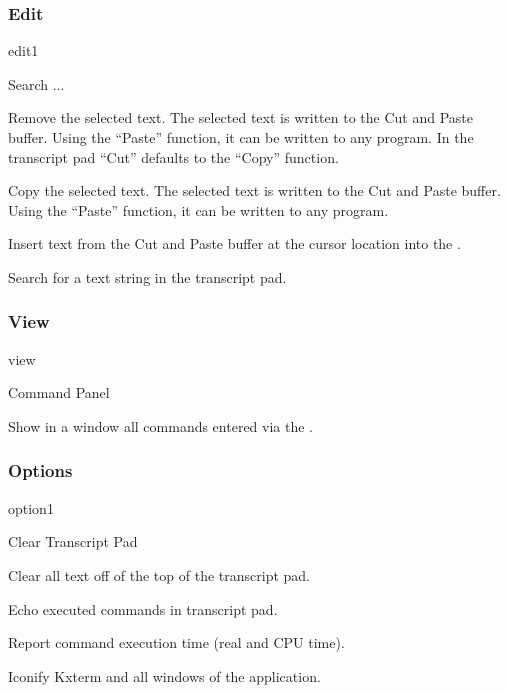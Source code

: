 \subsubsection{Edit}
\begin{PAWf}{edit1}
\begin{DLsf}{Search ...}
\item[Cut]
         Remove the selected text. The selected text is written to the
         Cut and Paste buffer. Using the ``Paste'' function, it can be
         written to any \Xxi program. In the transcript pad ``Cut''
         defaults to the ``Copy'' function.
\item[Copy]
         Copy the selected text. The selected text is written to the
         Cut and Paste buffer. Using the ``Paste'' function, it can be
         written to any \Xxi program.
\item[Paste]
         Insert text from the Cut and Paste buffer at the cursor location
         into the \IP.
\item[Search...]
         Search for a text string in the transcript pad.
\end{DLsf}
\end{PAWf}

\subsubsection{View}

\begin{PAWf}{view}
\begin{DLsf}{Command Panel}
\item[Show Input]
         Show in a window all commands entered via the \IP.
\item[Command Panel]
\item[Browser]
\item[Style Panel]
\end{DLsf}
\end{PAWf}

\subsubsection{Options}

\begin{PAWf}{option1}
\begin{DLsf}{Clear Transcript Pad}
\item[Clear Transcript Pad]
         Clear all text off of the top of the transcript pad.
\item[Echo Command]
         Echo executed commands in transcript pad.
\item[Timing]
         Report command execution time (real and CPU time).
\item[Iconify]
         Iconify Kxterm and all windows of the application.

\end{DLsf}
\end{PAWf}

